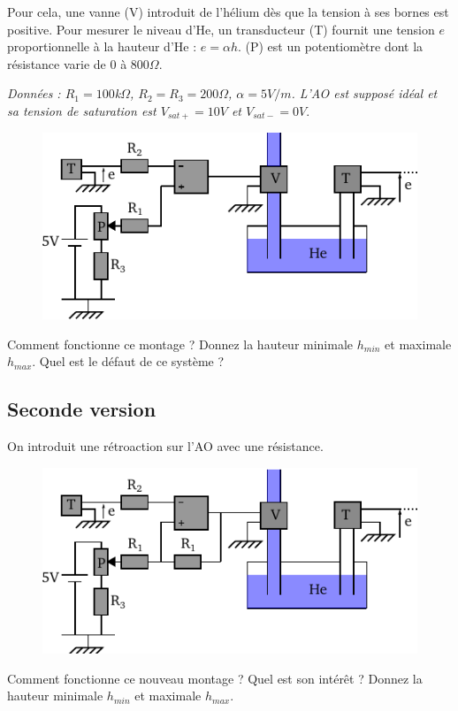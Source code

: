 \documentclass{report}
\begin{document}
Pour cela, une vanne (V) introduit de l'hélium dès que la tension à ses bornes est positive. Pour mesurer le niveau d'He, un transducteur (T) fournit une tension $e$ proportionnelle à la hauteur d'He : $e= \alpha h$. (P) est un potentiomètre dont la résistance varie de $0$ à $800\Omega$.

\textit{Données : $R_{1} = 100$k$\Omega$, $R_{2}=R_{3}=200\Omega$, $\alpha = 5V/m$. L'AO est supposé idéal et sa tension de saturation est $V_{sat+}=10V$ et $V_{sat-}=0V.$}

\begin{figure}[!h]
\centering
\includegraphics[width=0.8\linewidth]{circuit_10.pdf}
\end{figure}

Comment fonctionne ce montage ? Donnez la hauteur minimale $h_{min}$ et maximale $h_{max}$. Quel est le défaut de ce système ?

\subsection*{Seconde version}
On introduit une rétroaction sur l'AO avec une résistance.

\begin{figure}[!h]
\centering
\includegraphics[width=0.8\linewidth]{circuit_11.pdf}
\end{figure}

Comment fonctionne ce nouveau montage ? Quel est son intérêt ? Donnez la hauteur minimale $h_{min}$ et maximale $h_{max}$.
\end{document}
